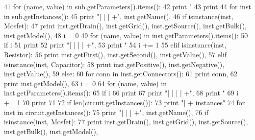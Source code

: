 \begin{DoxyCodeInclude}
{{41           \textcolor{keywordflow}{for} (name, value) \textcolor{keywordflow}{in} sub.getParameters().items():
42             \textcolor{keywordflow}{print} \textcolor{stringliteral}{"%
43       \textcolor{keywordflow}{print}
44       \textcolor{keywordflow}{for} inst \textcolor{keywordflow}{in} sub.getInstances():
45           \textcolor{keywordflow}{print} \textcolor{stringliteral}{"| | | +"}, inst.getName(),
46           \textcolor{keywordflow}{if} isinstance(inst, Mosfet):
47             \textcolor{keywordflow}{print} inst.getDrain(), inst.getGrid(), inst.getSource(), inst.getBulk(), inst.getModel(),
48             i = 0
49             \textcolor{keywordflow}{for} (name, value) \textcolor{keywordflow}{in} inst.getParameters().items():
50               \textcolor{keywordflow}{if} i%
51                 \textcolor{keywordflow}{print} 
52                 \textcolor{keywordflow}{print} \textcolor{stringliteral}{"| | | | +"},
53               \textcolor{keywordflow}{print} \textcolor{stringliteral}{"%
54               i += 1
55           \textcolor{keywordflow}{elif} isinstance(inst, Resistor):
56             \textcolor{keywordflow}{print} inst.getFirst(), inst.getSecond(), inst.getValue(),
57           \textcolor{keywordflow}{elif} isinstance(inst, Capacitor):
58             \textcolor{keywordflow}{print} inst.getPositive(), inst.getNegative(), inst.getValue(),
59           \textcolor{keywordflow}{else}:
60             \textcolor{keywordflow}{for} conn \textcolor{keywordflow}{in} inst.getConnectors():
61               \textcolor{keywordflow}{print} conn,
62             \textcolor{keywordflow}{print} inst.getModel(),
63             i = 0
64             \textcolor{keywordflow}{for} (name, value) \textcolor{keywordflow}{in} inst.getParameters().items():
65               \textcolor{keywordflow}{if} i%
66                 \textcolor{keywordflow}{print} 
67                 \textcolor{keywordflow}{print} \textcolor{stringliteral}{"| | | | +"},
68               \textcolor{keywordflow}{print} \textcolor{stringliteral}{"%
69               i += 1
70           \textcolor{keywordflow}{print}
71 
72   \textcolor{keywordflow}{if} len(circuit.getInstances()):
73     \textcolor{keywordflow}{print} \textcolor{stringliteral}{"| + instances"}
74     \textcolor{keywordflow}{for} inst \textcolor{keywordflow}{in} circuit.getInstances():
75       \textcolor{keywordflow}{print} \textcolor{stringliteral}{"| | | +"}, inst.getName(),
76       \textcolor{keywordflow}{if} isinstance(inst, Mosfet):
77         \textcolor{keywordflow}{print} inst.getDrain(), inst.getGrid(), inst.getSource(), inst.getBulk(), inst.getModel(),
}}}}}
\end{DoxyCodeInclude}
